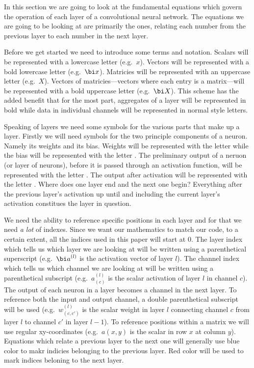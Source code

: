 \startsection[title=Layers of convolutional neural networks]

In this section we are going to look at the fundamental equations which govern the operation of each layer of a convolutional neural network.
The equations we are going to be looking at are primarily the  ones, relating each number from the previous layer to each number in the next layer.

\startsubsubject[title=Terminology and notation]
Before we get started we need to introduce some terms and notation.
Scalars will be represented with a lowercase letter (e.g.\ $x$).
Vectors will be represented with a bold lowercase letter (e.g.\ $\bi x$).
Matricies will be represented with an uppercase letter (e.g.\ $X$).
Vectors of matricies---vectors where each entry is a matrix---will be represented with a bold uppercase letter (e.g.\ $\bi X$).
This scheme has the added benefit that for the most part, aggregates of a layer will be represented in bold while data in individual channels will be represented in normal style letters.

Speaking of layers we need some symbols for the various parts that make up a layer.
Firstly we will need symbols for the two principle components of a neuron.
Namely its weights and its bias.
Weights will be represented with the letter  while the bias will be represented with the letter .
The preliminary output of a neruon (or layer of neurons), before it is passed through an activation function, will be represented with the letter .
The output after activation will be represented with the letter .
Where does one layer end and the next one begin?
Everything after the previous layer's activation up until and including the current layer's activation constitues the layer in question.

We need the ability to reference specific positions in each layer and for that we need {\em a lot} of indexes.
Since we want our mathematics to match our code, to a certain extent, all the indices used in this paper will start at $0$.
The layer index which tells us which layer we are looking at will be written using a parenthetical superscript (e.g.\ ${\bi a}^{(l)}$ is the activation vector of layer $l$).
The channel index which tells us which channel we are looking at will be written using a parenthetical subscript (e.g.\ $a^{(l)}_{(c)}$ is the scalar activation of layer $l$ in channel $c$).
The output of each neuron in a layer becomes a channel in the next layer.
To reference both the input and output channel, a double parenthetical subscript will be used (e.g.\ $w^{(l)}_{(c,c')}$ is the scalar weight in layer $l$ connecting channel $c$ from layer $l$ to channel $c'$ in layer $l-1$).
To reference positions within a matrix we will use regular xy-coordinates (e.g.\ $a(x,y)$ is the scalar in row $x$ at column $y$).
Equations which relate a previous layer to the next one will generally use blue color to makr indicies belonging to the previous layer.
Red color will be used to mark indices beloning to the next layer.

